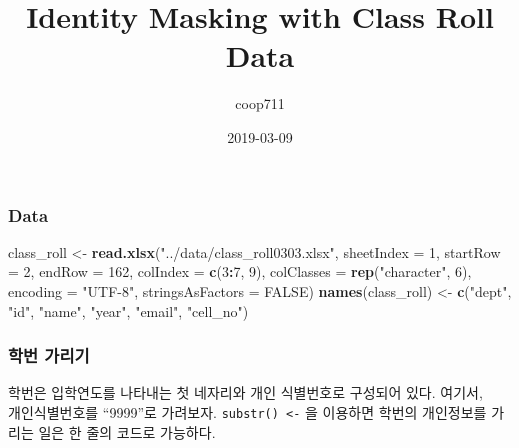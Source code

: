 \documentclass[]{article}
\title{Identity Masking with Class Roll Data}
\author{coop711}
\date{2019-03-09}
\newenvironment{Shaded}{\begin{snugshade}}{\end{snugshade}}
\newcommand{\KeywordTok}[1]{\textcolor[rgb]{0.13,0.29,0.53}{\textbf{#1}}}
\newcommand{\DataTypeTok}[1]{\textcolor[rgb]{0.13,0.29,0.53}{#1}}
\newcommand{\DecValTok}[1]{\textcolor[rgb]{0.00,0.00,0.81}{#1}}
\newcommand{\StringTok}[1]{\textcolor[rgb]{0.31,0.60,0.02}{#1}}
\newcommand{\OtherTok}[1]{\textcolor[rgb]{0.56,0.35,0.01}{#1}}
\newcommand{\OperatorTok}[1]{\textcolor[rgb]{0.81,0.36,0.00}{\textbf{#1}}}
\newcommand{\NormalTok}[1]{#1}
\begin{document}
\maketitle

\subsubsection{Data}\label{data}

\begin{Shaded}
\begin{Highlighting}[]
\NormalTok{class_roll <-}\StringTok{ }\KeywordTok{read.xlsx}\NormalTok{(}\StringTok{"../data/class_roll0303.xlsx"}\NormalTok{, }
                        \DataTypeTok{sheetIndex =} \DecValTok{1}\NormalTok{, }
                        \DataTypeTok{startRow =} \DecValTok{2}\NormalTok{, }
                        \DataTypeTok{endRow =} \DecValTok{162}\NormalTok{, }
                        \DataTypeTok{colIndex =} \KeywordTok{c}\NormalTok{(}\DecValTok{3}\OperatorTok{:}\DecValTok{7}\NormalTok{, }\DecValTok{9}\NormalTok{), }
                        \DataTypeTok{colClasses =} \KeywordTok{rep}\NormalTok{(}\StringTok{"character"}\NormalTok{, }\DecValTok{6}\NormalTok{), }
                        \DataTypeTok{encoding =} \StringTok{"UTF-8"}\NormalTok{, }
                        \DataTypeTok{stringsAsFactors =} \OtherTok{FALSE}\NormalTok{)}
\KeywordTok{names}\NormalTok{(class_roll) <-}\StringTok{ }\KeywordTok{c}\NormalTok{(}\StringTok{"dept"}\NormalTok{, }\StringTok{"id"}\NormalTok{, }\StringTok{"name"}\NormalTok{, }\StringTok{"year"}\NormalTok{, }\StringTok{"email"}\NormalTok{, }\StringTok{"cell_no"}\NormalTok{)}
\end{Highlighting}
\end{Shaded}

\subsubsection{학번 가리기}\label{-}

학번은 입학연도를 나타내는 첫 네자리와 개인 식별번호로 구성되어 있다.
여기서,\\
개인식별번호를 ``9999''로 가려보자. \texttt{substr()\ \textless{}-} 을
이용하면 학번의 개인정보를 가리는 일은 한 줄의 코드로 가능하다.

\begin{Shaded}
\end{Shaded}
\end{document}
